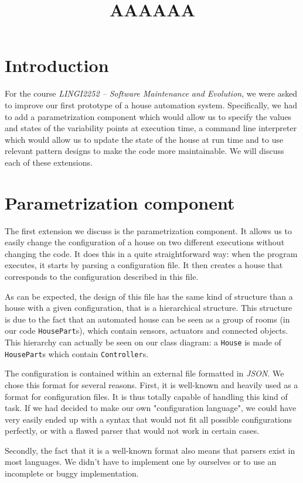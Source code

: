     \title{AAAAAA}
    \newpage

	\section{Introduction}
		For the course \textit{LINGI2252 -- Software Maintenance and Evolution}, we were asked to improve our first prototype of a house automation system. Specifically, we had to add a parametrization component which would allow us to specify the values and states of the variability points at execution time, a command line interpreter which would allow us to update the state of the house at run time and to use relevant pattern designs to make the code more maintainable. We will discuss each of these extensions.

	\section{Parametrization component}
		The first extension we discuss is the parametrization component.
		It allows us to easily change the configuration of a house on two different executions without changing the code.
		It does this in a quite straightforward way: when the program executes, it starts by parsing a configuration file. It then creates a house that corresponds to the configuration described in this file.
		
		As can be expected, the design of this file has the same kind of structure than a house with a given configuration, that is a hierarchical structure. This structure is due to the fact that an automated house can be seen as a group of rooms (in our code \texttt{HousePart}s), which contain sensors, actuators and connected objects. This hierarchy can actually be seen on our class diagram: a \texttt{House} is made of \texttt{HousePart}s which contain \texttt{Controller}s.
		
		The configuration is contained within an external file formatted in \textit{JSON}. We chose this format for several reasons.
		First, it is well-known and heavily used as a format for configuration files. It is thus totally capable of handling this kind of task. If we had decided to make our own "configuration language", we could have very easily ended up with a syntax that would not fit all possible configurations perfectly, or with a flawed parser that would not work in certain cases.

		Secondly, the fact that it is a well-known format also means that parsers exist in most languages. We didn't have to implement one by ourselves or to use an incomplete or buggy implementation.

